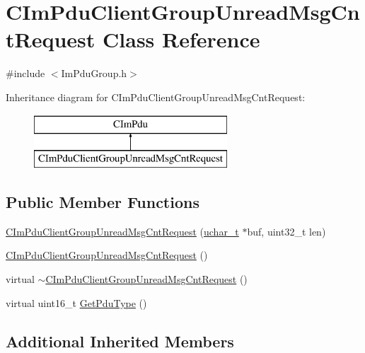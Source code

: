 \hypertarget{class_c_im_pdu_client_group_unread_msg_cnt_request}{}\section{C\+Im\+Pdu\+Client\+Group\+Unread\+Msg\+Cnt\+Request Class Reference}
\label{class_c_im_pdu_client_group_unread_msg_cnt_request}


{\ttfamily \#include $<$Im\+Pdu\+Group.\+h$>$}

Inheritance diagram for C\+Im\+Pdu\+Client\+Group\+Unread\+Msg\+Cnt\+Request\+:\begin{figure}[H]
\begin{center}
\leavevmode
\includegraphics[height=2.000000cm]{class_c_im_pdu_client_group_unread_msg_cnt_request}
\end{center}
\end{figure}
\subsection*{Public Member Functions}
\begin{DoxyCompactItemize}
\item 
\hyperlink{class_c_im_pdu_client_group_unread_msg_cnt_request_abd7cc2ea865d67e9d83e2661bbc30ad3}{C\+Im\+Pdu\+Client\+Group\+Unread\+Msg\+Cnt\+Request} (\hyperlink{base_2ostype_8h_a124ea0f8f4a23a0a286b5582137f0b8d}{uchar\+\_\+t} $\ast$buf, uint32\+\_\+t len)
\item 
\hyperlink{class_c_im_pdu_client_group_unread_msg_cnt_request_a108118b59d65038324a43847a6d8d88d}{C\+Im\+Pdu\+Client\+Group\+Unread\+Msg\+Cnt\+Request} ()
\item 
virtual \hyperlink{class_c_im_pdu_client_group_unread_msg_cnt_request_ae47b814a0a216a023f20192d175c98fb}{$\sim$\+C\+Im\+Pdu\+Client\+Group\+Unread\+Msg\+Cnt\+Request} ()
\item 
virtual uint16\+\_\+t \hyperlink{class_c_im_pdu_client_group_unread_msg_cnt_request_a24ed5ed2233b294288669f3434e2623f}{Get\+Pdu\+Type} ()
\end{DoxyCompactItemize}
\subsection*{Additional Inherited Members}


